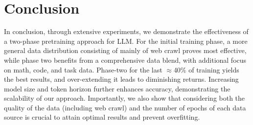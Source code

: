 \documentclass[11pt]{article}
\newcommand{\mostofa}[1]{{\color{blue}\bf [MP: #1]}\xspace}
\begin{document}
\section{Conclusion}
In conclusion, through extensive experiments, we demonstrate the effectiveness of a two-phase pretraining approach for LLM. %
For the initial training phase, a more general data distribution consisting of mainly of web crawl proves most effective, while phase two benefits from a comprehensive data blend, with additional focus on math, code, and task data. Phase-two for the last $\approx$40\% of training yields the best results, and over-extending it leads to diminishing returns. Increasing model size and token horizon further enhances accuracy, demonstrating the scalability of our approach. Importantly, we also show that considering both the quality of the data (including web crawl) and the number of epochs of each data source is crucial to attain optimal results and prevent overfitting.
\end{document}
